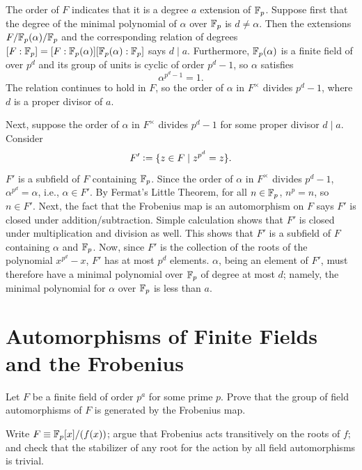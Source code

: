 \documentclass[12pt]{article}
\begin{document}
\noindent\dotfill 

The order of $F$ indicates that it is a degree $a$ extension of $\mathbb{F}_p$. 
Suppose first that the degree of the minimal polynomial of $\alpha$ over $\mathbb{F}_p$ is $d \neq \alpha$. 
Then the extensions $F / \mathbb{F}_{p}(\alpha) / \mathbb{F}_p$ and the corresponding relation of degrees $[F : \mathbb{F}_p] = [F : \mathbb{F}_p(\alpha)][\mathbb{F}_p(\alpha) : \mathbb{F}_p]$ says $d \mid a$. 
Furthermore, $\mathbb{F}_p(\alpha)$ is a finite field of over $p^d$ and its group of units is cyclic of order $p^d - 1$, so $\alpha$ satisfies 
$$\alpha^{p^d - 1} = 1.$$
The relation continues to hold in $F$, so the order of $\alpha$ in $F^\times$ divides $p^d - 1$, where $d$ is a proper divisor of $a$. 
 
Next, suppose the order of $\alpha$ in $F^\times$ divides $p^d - 1$ for some proper divisor $d \mid a$.
Consider 
$$F' \vcentcolon= \{z \in F \mid z^{p^d} = z\}.$$
$F'$ is a subfield of $F$ containing $\mathbb{F}_p$. 
Since the order of $\alpha$ in $F^\times$ divides $p^d - 1$, $\alpha^{p^d} = \alpha$, i.e., $\alpha \in F'$. 
By Fermat's Little Theorem, for all $n \in \mathbb{F}_p$, $n^p = n$, so $n \in F'$. 
Next, the fact that the Frobenius map is an automorphism on $F$ says $F'$ is closed under addition/subtraction. 
Simple calculation shows that $F'$ is closed under multiplication and division as well. 
This shows that $F'$ is a subfield of $F$ containing $\alpha$ and $\mathbb{F}_p$. 
Now, since $F'$ is the collection of the roots of the polynomial $x^{p^d} - x$, $F'$ has at most $p^d$ elements. 
$\alpha$, being an element of $F'$, must therefore have a minimal polynomial over $\mathbb{F}_p$ of degree at most $d$; 
namely, the minimal polynomial for $\alpha$ over $\mathbb{F}_p$ is less than $a$. 
 
\section{Automorphisms of Finite Fields and the Frobenius}
 
Let $F$ be a finite field of order $p^a$ for some prime $p$. Prove that the group of field automorphisms of $F$ is generated by the Frobenius map.
 
\begin{hint}
Write $F \equiv \F_p[x]/(f(x))$; argue that Frobenius acts transitively on the roots of $f$; and check that the stabilizer of any root for the action by all field automorphisms is trivial.
\end{hint}
\end{document}
